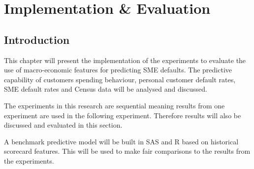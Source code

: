 
\chapter{Implementation \& Evaluation} %

\label{Chapter5} %


\section{Introduction}
This chapter will present the implementation of the experiments to evaluate the use of macro-economic features for predicting SME defaults. The predictive capability of customers spending behaviour, personal customer default rates, SME default rates and Census data  will be analysed and discussed.

The experiments in this research are sequential meaning results from one experiment are used in the following experiment. Therefore results will also be discussed and evaluated in this section.

A benchmark predictive model will be built in SAS and R based on historical scorecard features. This will be used to make fair comparisons to the results from the experiments.


